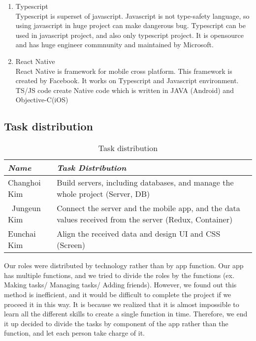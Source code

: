 \documentclass[conference]{IEEEtran}
\begin{document}
\begin{enumerate}
    \item Typescript \\
    Typescript is superset of javascript. Javascript is not type-safety language, so using javascript in huge project can make dangerous bug. Typescript can be used in javascript project, and also only typescript project. It is opensource and has huge engineer commnunity and maintained by Microsoft. \\
    
    \item React Native \\
    React Native is framework for mobile cross platform. This framework is created by Facebook. It works on Typescript and Javascript environment. TS/JS code create Native code which is written in JAVA (Android) and Objective-C(iOS)
    
\end{enumerate}

\subsection{Task distribution}

\begin{table}[h!]
\caption{Task distribution}
\begin{center}
\begin{tabular}{ | m{2cm} | m{6cm} | }
\hline
\textbf{\textit{Name}}& \textbf{\textit{Task Distribution}} \\
\hline
Changhoi Kim& Build servers, including databases, and manage the whole project (Server, DB) \\
\hline\
Jungeun Kim & Connect the server and the mobile app, and the data values received from the server (Redux, Container) \\
\hline
Eunchai Kim & Align the received data and design UI and CSS (Screen) \\
\hline
\end{tabular}
\label{tab1}
\end{center}
\end{table}

Our roles were distributed by technology rather than by app function. Our app has multiple functions, and we tried to divide the roles by the functions (ex. Making tasks/ Managing tasks/ Adding friends). However, we found out this method is inefficient, and it would be difficult to complete the project if we proceed it in this way. It is because we realized that it is almost impossible to learn all the different skills to create a single function in time. Therefore, we end it up decided to divide the tasks by component of the app rather than the function, and let each person take charge of it. \\
\end{document}
